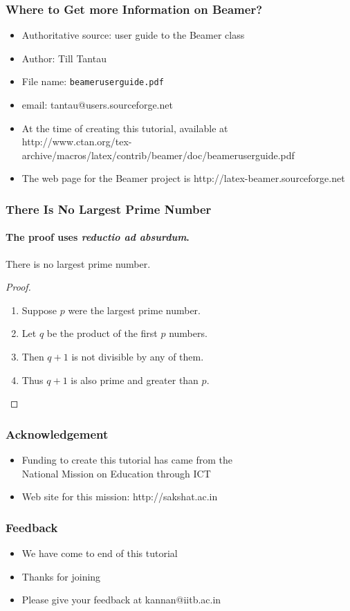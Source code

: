 \documentclass[handout]{beamer}
\begin{document}
\begin{frame}
\frametitle{Where to Get more Information on
  Beamer?} 
\begin{itemize}
\item<+-|alert@+> Authoritative source: user guide to the Beamer class
\item<+-|alert@+> Author: Till Tantau
\item<+-|alert@+> File name: 
  {\color{magenta} \tt beameruserguide.pdf} 
\item<+-|alert@+> email: tantau@users.sourceforge.net 
\item<+-|alert@+> At the time of creating this
  tutorial, available at \\
{\color{magenta} \small http://www.ctan.org/tex-archive/macros/latex/contrib/beamer/doc/beameruserguide.pdf}
\item<+-|alert@+> The web page for the Beamer
  project is
{\color{magenta} http://latex-beamer.sourceforge.net}
\end{itemize}
\end{frame}

\begin{frame} 
\frametitle{There Is No Largest Prime Number} 
\framesubtitle{The proof uses \textit{reductio ad absurdum}.} 
\begin{theorem} 
There is no largest prime number. 
\end{theorem} 
\begin{proof} 
\begin{enumerate} 
\item<1-| alert@1> Suppose $p$ were the largest prime number. 
\item<2-> Let $q$ be the product of the first $p$ numbers. 
\item<3-> Then $q+1$ is not divisible by any of them. 
\item<1-> Thus $q+1$ is also prime and greater than $p$.\qedhere 
\end{enumerate} 
\end{proof} 
\end{frame} 

\begin{frame}
\frametitle{Acknowledgement}
\begin{itemize}
\item Funding to create this tutorial has came from
  the \\ National Mission on Education through ICT
\item Web site for this mission:
  {\color{magenta} http://sakshat.ac.in}
\end{itemize}
\end{frame}

\begin{frame}
\frametitle{Feedback}
\begin{itemize}
\item We have come to end of this tutorial
\item Thanks for joining 
\item Please give your feedback at kannan@iitb.ac.in
\end{itemize}
\end{frame}
\end{document}
